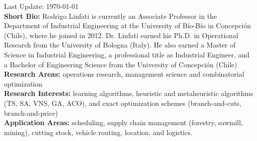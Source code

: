 \makecvtitle
Last Update: \today
~ \\
\textbf{Short Bio:} Rodrigo Linfati is currently an Associate Professor in the Department of Industrial Engineering at the University of B\'io-B\'io in Concepci\'on (Chile), where he joined in 2012. Dr. Linfati earned his Ph.D. in Operational Research from the University of Bologna (Italy). He also earned a Master of Science in Industrial Engineering, a professional title as Industrial Engineer, and a Bachelor of Engineering Science from the University of Concepci\'on (Chile)
~ \\
\textbf{Research Areas:} operations research, management science and combinatorial optimization
~ \\
\textbf{Research Interests:} learning algorithms, heuristic and metaheuristic algorithms (TS, SA, VNS, GA, ACO), and exact optimization schemes (branch-and-cuts, branch-and-price)
~ \\
\textbf{Application Areas:} scheduling, supply chain management (forestry, sawmill, mining), cutting stock, vehicle routing, location, and logistics.

\clearpage